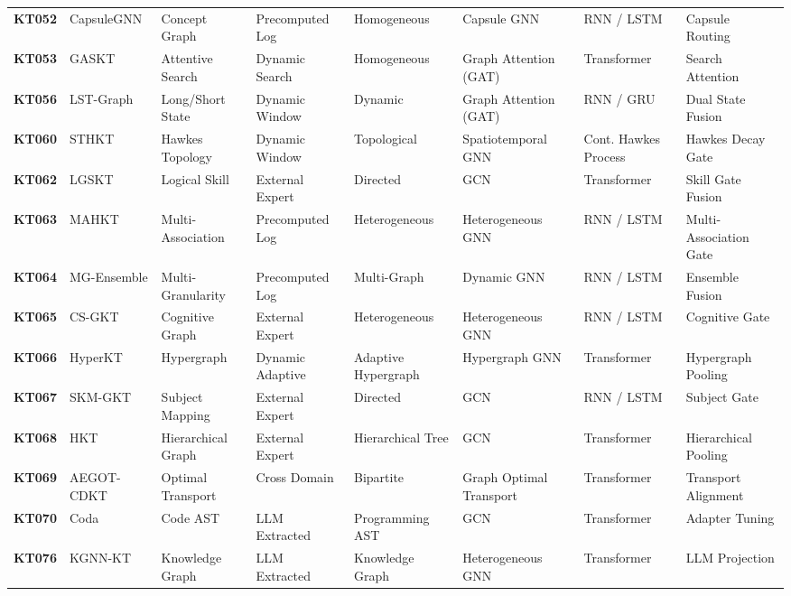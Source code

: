 \documentclass[10pt,journal,compsoc]{IEEEtran}
\begin{document}
\begin{table}[t]
{\begin{tabular}{@{}l l l l l l l l@{}}
\textbf{KT052} & CapsuleGNN \cite{KT052_CapsuleGNN_2022} & Concept Graph & Precomputed Log & Homogeneous & Capsule GNN & RNN / LSTM & Capsule Routing \\
\textbf{KT053} & GASKT \cite{KT053_GASKT_2021} & Attentive Search & Dynamic Search & Homogeneous & Graph Attention (GAT) & Transformer & Search Attention \\
\textbf{KT056} & LST-Graph \cite{KT056_LSTGraph_2025} & Long/Short State & Dynamic Window & Dynamic & Graph Attention (GAT) & RNN / GRU & Dual State Fusion \\
\textbf{KT060} & STHKT \cite{KT060_STHKT_2025} & Hawkes Topology & Dynamic Window & Topological & Spatiotemporal GNN & Cont. Hawkes Process & Hawkes Decay Gate \\
\textbf{KT062} & LGSKT \cite{KT062_LGSKT_2025} & Logical Skill & External Expert & Directed & GCN & Transformer & Skill Gate Fusion \\
\textbf{KT063} & MAHKT \cite{KT063_MAHKT_2025} & Multi-Association & Precomputed Log & Heterogeneous & Heterogeneous GNN & RNN / LSTM & Multi-Association Gate \\
\textbf{KT064} & MG-Ensemble \cite{KT064_MGEnsemble_2025} & Multi-Granularity & Precomputed Log & Multi-Graph & Dynamic GNN & RNN / LSTM & Ensemble Fusion \\
\textbf{KT065} & CS-GKT \cite{KT065_CSGKT_2025} & Cognitive Graph & External Expert & Heterogeneous & Heterogeneous GNN & RNN / LSTM & Cognitive Gate \\
\textbf{KT066} & HyperKT \cite{KT066_HyperKT_2025} & Hypergraph & Dynamic Adaptive & Adaptive Hypergraph & Hypergraph GNN & Transformer & Hypergraph Pooling \\
\textbf{KT067} & SKM-GKT \cite{KT067_SKMGKT_2025} & Subject Mapping & External Expert & Directed & GCN & RNN / LSTM & Subject Gate \\
\textbf{KT068} & HKT \cite{KT068_HKT_2025} & Hierarchical Graph & External Expert & Hierarchical Tree & GCN & Transformer & Hierarchical Pooling \\
\textbf{KT069} & AEGOT-CDKT \cite{KT069_AEGOTCDKT_2025} & Optimal Transport & Cross Domain & Bipartite & Graph Optimal Transport & Transformer & Transport Alignment \\
\textbf{KT070} & Coda \cite{KT070_Coda_2025} & Code AST & LLM Extracted & Programming AST & GCN & Transformer & Adapter Tuning \\
\textbf{KT076} & KGNN-KT \cite{KT076_KGNNKT_2025} & Knowledge Graph & LLM Extracted & Knowledge Graph & Heterogeneous GNN & Transformer & LLM Projection \\

\end{tabular}}
\end{table}
\end{document}

